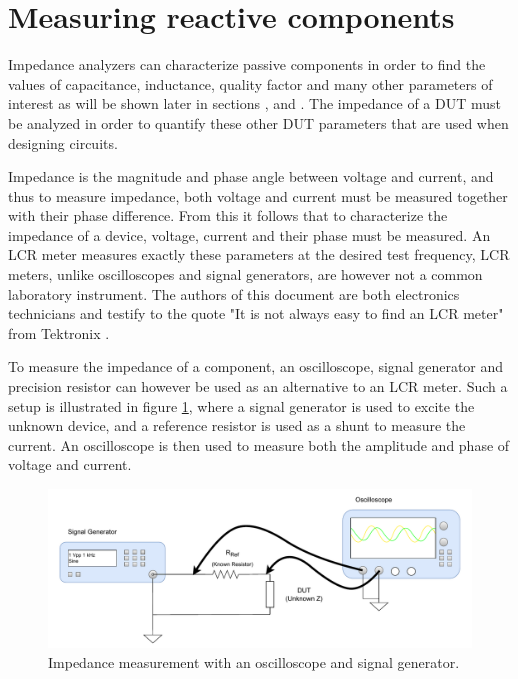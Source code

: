 \section{Measuring reactive components} \label{sec:MeasureReactiveComponents}
Impedance analyzers can characterize passive components in order to find the values of capacitance, inductance, quality factor and many other parameters of interest as will be shown later in sections ,  and . The impedance of a DUT must be analyzed in order to quantify these other DUT parameters that are used when designing circuits.

Impedance is the magnitude and phase angle between voltage and current, and thus to measure impedance, both voltage and current must be measured together with
their phase difference. From this it follows that to characterize the impedance of a device, voltage, current and their phase must be measured. An LCR meter measures exactly these parameters
at the desired test frequency, LCR meters, unlike oscilloscopes and signal generators, are however not a common laboratory instrument. The authors of this document are both
electronics technicians and testify to the quote "It is not always easy to find an LCR meter" from Tektronix \Cite{TextronixZMeas}. 

To measure the impedance of a component, an oscilloscope, signal generator and precision resistor can however be used as an alternative to an LCR meter. Such a setup is illustrated in figure \ref{fig_2.1_ImpedanceMeas}, where a signal generator is used to excite the unknown device, and a reference resistor is used as a shunt to measure the current. An oscilloscope is then used to measure both the amplitude and phase of voltage and current. 

\begin{figure}[H]
    \centering
    \includegraphics[width=1\textwidth]{Sections/2_ProblemAnalysis/Figures/ScopeGenZMeas.pdf}
    \caption{Impedance measurement with an oscilloscope and signal generator.}
    \label{fig_2.1_ImpedanceMeas}
\end{figure}

